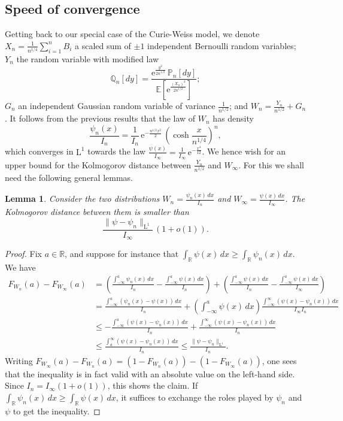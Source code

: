 \documentclass[12pt,a4paper,reqno]{amsart}
\newcommand{\R}{\mathbb{R}}
\newcommand{\E}{\mathrm{e}}
\newcommand{\esper}{\mathbb{E}}
\newcommand{\proba}{\mathbb{P}}
\newcommand{\qproba}{\mathbb{Q}}
\newcommand{\leb}{\mathrm{L}}
\newtheorem{lemma}[theorem]{Lemma}
\theoremstyle{remark}
\begin{document}
\subsection{Speed of convergence}\label{subsec:speedofconv}
Getting back to our special case of the Curie-Weiss model, we denote $X_n=\frac{1}{n^{1/4}}\sum_{i=1}^n B_i$ a scaled sum of $\pm 1$ independent Bernoulli random variables; $Y_n$ the random variable with modified law 
$$\qproba_n[dy]=\frac{\E^{\frac{y^2}{2n^{1/2}}}\,\proba_n[dy]}{\esper\!\left[\E^{\frac{(X_n)^2}{2n^{1/2}}}\right]};$$
$G_n$ an independent Gaussian random variable of variance $\frac{1}{n^{1/2}}$; and $W_n=\frac{Y_n}{n^{1/2}} + G_n$. It follows from the previous results that the law of $W_n$ has density
$$\frac{\psi_n(x)}{I_n}=\frac{1}{I_n}\,\E^{-\frac{n^{1/2}x^2}{2}}\,\left( \cosh \frac{x}{n^{1/4}}\right)^n,$$
which converges in $\leb^1$ towards the law $\frac{\psi(x)}{I_\infty}=\frac{1}{I_\infty}\,\E^{-\frac{x^4}{12}}$. We hence wish for an upper bound for the Kolmogorov distance between $\frac{Y_n}{n^{1/2}}$ and $W_\infty$. For this we shall need the following general lemmas.
\bigskip

\begin{lemma}\label{lem:kolmogorov}
Consider the two distributions $W_n = \frac{\psi_n(x)\,dx}{I_n}$ and $W_\infty = \frac{\psi(x)\,dx}{I_\infty}$. The Kolmogorov distance between them is smaller than
$$\frac{\|\psi-\psi_n\|_{\mathrm{L}^1}}{I_\infty}\,(1+o(1)).$$
\end{lemma}

\begin{proof}
Fix  $a \in \R$, and suppose for instance that $\int_\R \psi(x)\,dx \geq \int_{\R} \psi_n(x)\,dx$. We have
\begin{align*}
F_{W_n}(a)-F_{W_{\infty}}(a) &= \left(\frac{\int_{-\infty}^a \psi_n(x)\,dx }{I_n}-\frac{\int_{-\infty}^a \psi(x)\,dx }{I_n}\right) \!+\! \left(\frac{\int_{-\infty}^a \psi(x)\,dx }{I_n}-\frac{\int_{-\infty}^a \psi(x)\,dx }{I_\infty}\right) \\
&= \frac{\int_{-\infty}^a (\psi_n(x)-\psi(x))\,dx}{I_n} + \left(\int_{-\infty}^a \psi(x)\,dx\right) \frac{\int_{-\infty}^\infty (\psi(x)-\psi_n(x))\,dx}{I_\infty I_n}\\
&\leq -\frac{\int_{-\infty}^a (\psi(x)-\psi_n(x))\,dx}{I_n}+\frac{\int_{-\infty}^\infty (\psi(x)-\psi_n(x))\,dx}{I_n}\\
&\leq \frac{\int_{a}^\infty (\psi(x)-\psi_n(x))\,dx}{I_n} \leq \frac{\|\psi-\psi_n\|_{\mathrm{L}^1}}{I_n}.
\end{align*}
Writing $F_{W_{\infty}}(a)-F_{W_n}(a) = (1-F_{W_n}(a)) - (1-F_{W_\infty}(a))$, one sees that the inequality is in fact valid with an absolute value on the left-hand side. Since $I_n=I_{\infty} (1+o(1))$, this shows the claim. If $\int_{\R} \psi_n(x)\,dx \geq \int_{\R} \psi(x)\,dx$, it suffices to exchange the roles played by $\psi_n$ and $\psi$ to get the inequality.
\end{proof}\bigskip
\end{document}
